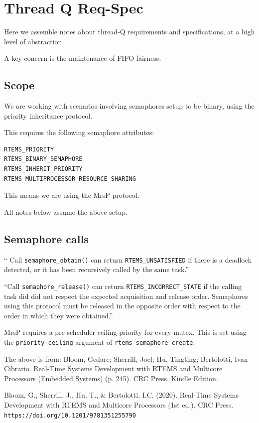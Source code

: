 \section{Thread Q Req-Spec}

Here we assemble notes about thread-Q requirements and specifications,
at a high level of abstraction.

A key concern is the maintenance of FIFO fairness.

\subsection{Scope}

We are working with scenarios involving semaphores
setup to be binary, using the priority inheritance protocol.

This requires the following semaphore attributes:
\begin{verbatim}
RTEMS_PRIORITY
RTEMS_BINARY_SEMAPHORE
RTEMS_INHERIT_PRIORITY
RTEMS_MULTIPROCESSOR_RESOURCE_SHARING
\end{verbatim}

This means we are using the MrsP protocol.

All notes below assume the above setup.

\subsection{Semaphore calls}

``
Call \verb"semaphore_obtain()" can return \verb"RTEMS_UNSATISFIED"
if there is a deadlock detected,
or it has been recursively called  by the same task.''

``Call \verb"semaphore_release()" can return \verb"RTEMS_INCORRECT_STATE"
if the calling task did did not respect
the expected acquisition and  release order.
Semaphores using this protocol must be released
in the opposite order with respect to the order in which they were obtained.''


MrsP requires a pre-scheduler ceiling priority for every mutex.
This is set using the \verb"priority_ceiling"  argument
of \verb"rtems_semaphore_create".

The above is from:
Bloom, Gedare; Sherrill, Joel; Hu, Tingting; Bertolotti, Ivan Cibrario.
Real-Time Systems Development with RTEMS and Multicore Processors
(Embedded Systems) (p. 245). CRC Press. Kindle Edition.

Bloom, G., Sherrill, J., Hu, T., \& Bertolotti, I.C. (2020).
Real-Time Systems Development with RTEMS and Multicore Processors (1st ed.).
CRC Press.
\verb"https://doi.org/10.1201/9781351255790"

